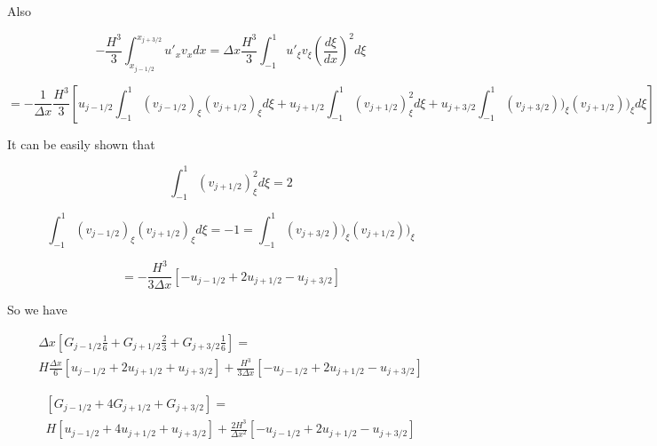 \documentclass[12pt]{article}
\begin{document}
Also 

\[ - \frac{H^3}{3}\int_{x_{j-1/2}}^{x_{j+3/2}}u'_{x}v_{x}dx = \Delta x \frac{H^3}{3}\int_{-1}^{1 }u'_{\xi}v_{\xi} (\frac{d\xi}{dx})^2d\xi \]

\[ = -\frac{1}{\Delta x} \frac{H^3}{3}\left[u_{j -1/2} \int_{-1}^{1}(v_{j - 1/2})_\xi (v_{j + 1/2})_\xi d\xi + u_{j +1/2}\int_{-1}^{1}(v_{j + 1/2})_\xi^2d\xi + u_{j +3/2}\int_{-1}^{1}(v_{j +3/2}))_\xi (v_{j + 1/2}))_\xi d\xi\right]\]

It can be easily shown that 

\[\int_{-1}^{1}(v_{j + 1/2})_\xi^2d\xi = 2\]

\[\int_{-1}^{1}(v_{j - 1/2})_\xi (v_{j + 1/2})_\xi d\xi = -1 = \int_{-1}^{1}(v_{j +3/2}))_\xi (v_{j + 1/2}))_\xi \]

\[ = - \frac{H^3}{3 \Delta x}\left[ -u_{j -1/2} + 2u_{j +1/2} - u_{j +3/2}\right]\]

So we have

\begin{multline}
\Delta x\left[G_{j -1/2} \frac{1}{6}  + G_{j +1/2}\frac{2}{3} + G_{j +3/2}\frac{1}{6} \right] = \\H\frac{\Delta x}{6}\left[u_{j -1/2}  + 2u_{j +1/2} + u_{j +3/2} \right] + \frac{H^3}{3 \Delta x}\left[ -u_{j -1/2} + 2u_{j +1/2} - u_{j +3/2}\right]
\end{multline}

\begin{multline}
\left[G_{j -1/2}  + 4G_{j +1/2} + G_{j +3/2}\right] = \\H\left[u_{j -1/2}  + 4u_{j +1/2} + u_{j +3/2} \right] + \frac{2H^3}{\Delta x^2}\left[ -u_{j -1/2} + 2u_{j +1/2} - u_{j +3/2}\right]
\end{multline}
\end{document}
